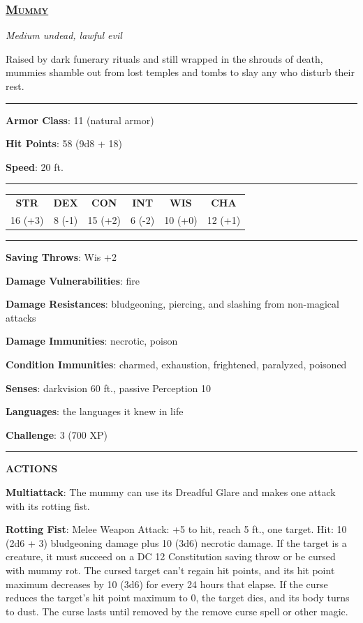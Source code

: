 \subsubsection*{\underline{\textsc{\Large Mummy}}}
\noindent\emph{Medium undead, lawful evil} 

Raised by dark funerary rituals and still wrapped in the shrouds of death, mummies shamble out from lost temples and tombs to slay any who disturb their rest.

\noindent\rule{0.5\textwidth}{0.5pt}

\noindent\textbf{Armor Class}: 11 (natural armor)

\noindent\textbf{Hit Points}: 58 (9d8 + 18)

\noindent\textbf{Speed}: 20 ft.

\noindent\rule{0.5\textwidth}{0.5pt}
\begin{table}[H]
	\begin{tabular}{cccccc}
		\textbf{STR} & \textbf{DEX} & \textbf{CON} & \textbf{INT} & \textbf{WIS} & \textbf{CHA} \\
		16 (+3) & 8 (-1) & 15 (+2) & 6 (-2) & 10 (+0) & 12 (+1) \\
	\end{tabular}
\end{table}
\noindent\rule{0.5\textwidth}{0.5pt}

\noindent\textbf{Saving Throws}: Wis +2

\noindent\textbf{Damage Vulnerabilities}: fire

\noindent\textbf{Damage Resistances}: bludgeoning, piercing, and slashing from non-magical attacks

\noindent\textbf{Damage Immunities}: necrotic, poison

\noindent\textbf{Condition Immunities}: charmed, exhaustion, frightened, paralyzed, poisoned

\noindent\textbf{Senses}: darkvision 60 ft., passive Perception 10

\noindent\textbf{Languages}: the languages it knew in life

\noindent\textbf{Challenge}: 3 (700 XP)

\noindent\rule{0.5\textwidth}{0.5pt}

\noindent\textbf{ACTIONS}

\noindent\textbf{Multiattack}: The mummy can use its Dreadful Glare and makes one attack with its rotting fist.

\noindent\textbf{Rotting Fist}: Melee Weapon Attack: +5 to hit, reach 5 ft., one target. Hit: 10 (2d6 + 3) bludgeoning damage plus 10 (3d6) necrotic damage. If the target is a creature, it must succeed on a DC 12 Constitution saving throw or be cursed with mummy rot. The cursed target can't regain hit points, and its hit point maximum decreases by 10 (3d6) for every 24 hours that elapse. If the curse reduces the target's hit point maximum to 0, the target dies, and its body turns to dust. The curse lasts until removed by the remove curse spell or other magic.


